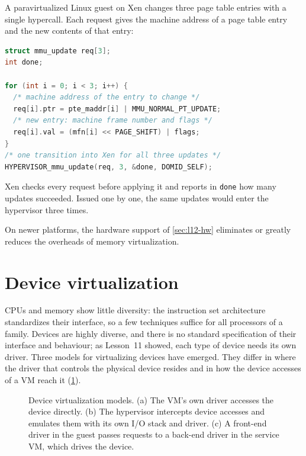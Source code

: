 \documentclass[../main.tex]{subfiles}
\begin{document}
\begin{example}
  A paravirtualized Linux guest on Xen changes three page table entries
  with a single hypercall.  Each request gives the machine address of a
  page table entry and the new contents of that entry:
  \begin{lstlisting}[language=C, numbers=none]
struct mmu_update req[3];
int done;

for (int i = 0; i < 3; i++) {
  /* machine address of the entry to change */
  req[i].ptr = pte_maddr[i] | MMU_NORMAL_PT_UPDATE;
  /* new entry: machine frame number and flags */
  req[i].val = (mfn[i] << PAGE_SHIFT) | flags;
}
/* one transition into Xen for all three updates */
HYPERVISOR_mmu_update(req, 3, &done, DOMID_SELF);
\end{lstlisting}
  Xen checks every request before applying it and reports in
  \texttt{done} how many updates succeeded.  Issued one by one, the same
  updates would enter the hypervisor three times.
\end{example}

On newer platforms, the hardware support of \cref{sec:l12-hw} eliminates
or greatly reduces the overheads of memory virtualization.

\section{Device virtualization}
\label{sec:l12-devices}

CPUs and memory show little diversity: the instruction set architecture
standardizes their interface, so a few techniques suffice for all
processors of a family.  Devices are highly diverse, and there is no standard
specification of their interface and behaviour; as Lesson~11 showed, each
type of device needs its own driver.  Three models for virtualizing devices
have emerged.  They differ in where the driver that controls the physical
device resides and in how the device accesses of a VM reach it
(\cref{fig:l12-devices}).

\begin{figure}[htbp]
  \centering
  
  \caption{Device virtualization models.  (a) The VM's own driver accesses
    the device directly.  (b) The hypervisor intercepts device accesses and
    emulates them with its own I/O stack and driver.  (c) A front-end
    driver in the guest passes requests to a back-end driver in the service
    VM, which drives the device.}
  \label{fig:l12-devices}
\end{figure}
\end{document}
